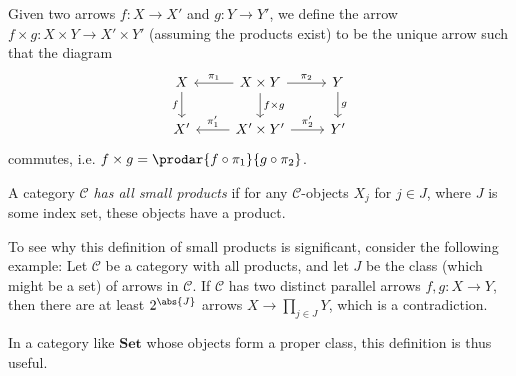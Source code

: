 \documentclass[article, a4paper, 11pt, oneside]{memoir}
\numberwithin{equation}{chapter}
\newcommand{\cat}[1]{\mathcal{#1}}
\newcommand{\ncat}[1]{\mathbf{#1}} %
\newcommand{\catSet}{\ncat{Set}}
\newcommand{\catC}{\cat{C}}
\theoremstyle{myexample}
\theoremstyle{myexamplebreak}
\begin{document}
Given two arrows $f \colon X \to X'$ and $g \colon Y \to Y'$, we define the arrow $f \times g \colon X \times Y \to X' \times Y'$ (assuming the products exist) to be the unique arrow such that the diagram
%
\begin{equation*}
    \begin{tikzcd}
        X
            \ar[d, "f", swap]
        & X \times Y
            \ar[l, "\pi_1", swap]
            \ar[r, "\pi_2"]
            \ar[d, "f \times g"]
        & Y
            \ar[d, "g"]
        \\
        X'
        & X' \times Y'
            \ar[l, "\pi'_1", swap]
            \ar[r, "\pi'_2"]
        & Y'
    \end{tikzcd}
\end{equation*}
%
commutes, i.e. $f \times g = \prodar{f \circ \pi_1}{g \circ \pi_2}$.




\begin{definition}
    A category $\catC$ \emph{has all small products} if for any $\catC$-objects $X_j$ for $j \in J$, where $J$ is some index set, these objects have a product.
\end{definition}

\begin{remark}
    To see why this definition of small products is significant, consider the following example: Let $\catC$ be a category with all products, and let $J$ be the class (which might be a set) of arrows in $\catC$. If $\catC$ has two distinct parallel arrows $f,g \colon X \to Y$, then there are at least $2^{\abs{J}}$ arrows $X \to \prod_{j \in J} Y$, which is a contradiction.

    In a category like $\catSet$ whose objects form a proper class, this definition is thus useful.
\end{remark}
\end{document}
